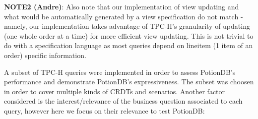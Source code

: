 \documentclass{vldb}
\begin{document}
\textbf{NOTE2 (Andre)}: Also note that our implementation of view updating and what would be automatically generated by a view specification do not match - namely, our implementation takes advantage of TPC-H's granularity of updating (one whole order at a time) for more efficient view updating. This is not trivial to do with a specification language as most queries depend on lineitem (1 item of an order) specific information.

A subset of TPC-H queries were implemented in order to assess PotionDB's performance and demonstrate PotionDB's expressiveness.
The subset was choosen in order to cover multiple kinds of CRDTs and scenarios.
Another factor considered is the interest/relevance of the business question associated to each query, however here we focus on their relevance to test PotionDB:
\end{document}
